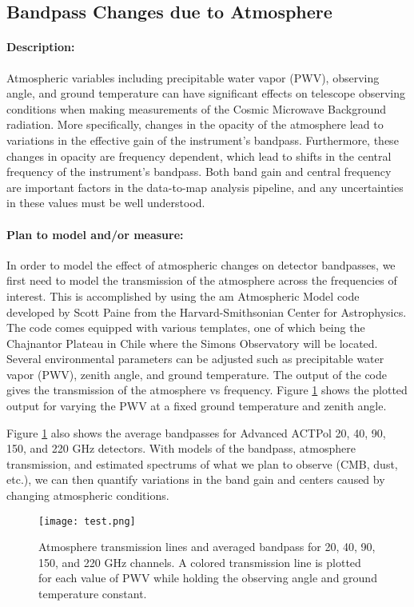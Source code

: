 \subsection{Bandpass Changes due to Atmosphere}

\paragraph{Description:}
Atmospheric variables including precipitable water vapor (PWV), observing angle, and ground temperature can have significant effects on telescope observing conditions when making measurements of the Cosmic Microwave Background radiation.  More specifically, changes in the opacity of the atmosphere lead to variations in the effective gain of the instrument's bandpass.  Furthermore, these changes in opacity are frequency dependent, which lead to shifts in the central frequency of the instrument's bandpass.  Both band gain and central frequency are important factors in the data-to-map analysis pipeline, and any uncertainties in these values must be well understood.

\paragraph{Plan to model and/or measure:}
In order to model the effect of atmospheric changes on detector bandpasses, we first need to model the transmission of the atmosphere across the frequencies of interest.  This is accomplished by using the am Atmospheric Model code developed by Scott Paine from the Harvard-Smithsonian Center for Astrophysics.  The code comes equipped with various templates, one of which being the Chajnantor Plateau in Chile where the Simons Observatory will be located.  Several environmental parameters can be adjusted such as precipitable water vapor (PWV), zenith angle, and ground temperature.  The output of the code gives the transmission of the atmosphere vs frequency.  Figure \ref{transmissions} shows the plotted output for varying the PWV at a fixed ground temperature and zenith angle.   

Figure \ref{transmissions} also shows the average bandpasses for Advanced ACTPol 20, 40, 90, 150, and 220 GHz detectors.  With models of the bandpass, atmosphere transmission, and estimated spectrums of what we plan to observe (CMB, dust, etc.), we can then quantify variations in the band gain and centers caused by changing atmospheric conditions.

\begin{figure}[h] %
   \centering
   \centerline{\texttt{[image: test.png]}} 
   \caption{Atmosphere transmission lines and averaged bandpass for 20, 40, 90, 150, and 220 GHz channels.  A colored transmission line is plotted for each value of PWV while holding the observing angle and ground temperature constant.}
   \label{transmissions}
\end{figure}

